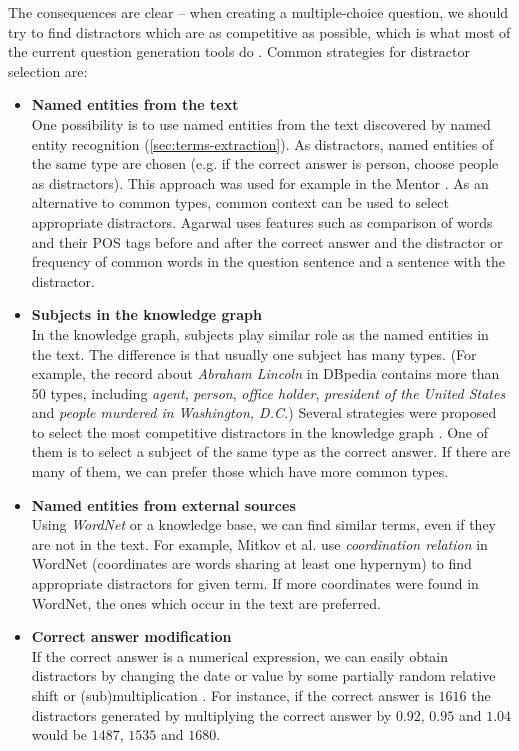 \documentclass[12pt, twoside]{fithesis2}
\renewcommand{\_}{\leavevmode \kern0.07em\vbox{\hrule width0.4em}}
\newcommand{\squarebullet}{\textcolor{black}{\raisebox{0.15em}{\rule{4pt}{4pt}}}}
\newcommand{\emptysquarebullet}{\textcolor{black}{\raisebox{0.10em}{\tiny$\square$}}}
\newenvironment{myItemize}{
  \begin{itemize}[leftmargin=2em,rightmargin=1em,itemsep=\parskip ,parsep=0em,topsep=0em,partopsep=0em]
  \renewcommand{\labelitemi}{\squarebullet}
  \renewcommand{\labelitemii}{\textbullet}
}{
  \end{itemize}
}
\newcounter{choice}
\begin{document}
The consequences are clear -- when creating a multiple-choice question, we should try to find distractors which are as competitive as possible,
which is what most of the current question generation tools do
\cite{question-gen-mitkov, question-gen-textbooks, mentor}.
Common strategies for distractor selection are:
\begin{myItemize}
\item \textbf{Named entities from the text}\\
  One possibility is to use named entities from the text discovered by named entity recognition (\autoref{sec:terms-extraction}). As distractors, named entities of the same type are chosen (e.g. if the correct answer is person, choose people as distractors). This approach was used for example in the Mentor \cite{mentor}.
As an alternative to common types, common context can be used to select appropriate distractors.
Agarwal \cite{question-gen-textbooks} uses features such as comparison of words and their POS tags before and after the correct answer and the distractor or frequency of common words in the question sentence and a sentence with the distractor.

\item \textbf{Subjects in the knowledge graph}\\
In the knowledge graph, subjects play similar role as the named entities in the text.
The difference is that usually one subject has many types.
(For example, the record about \emph{Abraham Lincoln} in DBpedia contains more than 50 types, including
\emph{agent}, \emph{person}, \emph{office holder}, \emph{president of the United States} and \emph{people murdered in Washington, D.C.})
Several strategies were proposed to select the most competitive distractors in the knowledge graph \cite{ontoque, question-gen-domain-ontologies}. One of them is to select a subject of the same type as the correct answer. If there are many of them, we can prefer those which have more common types.

\item \textbf{Named entities from external sources}\\
  Using \textit{WordNet} \cite{wordnet} or a knowledge base, we can find similar terms, even if they are not in the text. For example, Mitkov et al. \cite{question-gen-mitkov} use \textit{coordination relation} in WordNet (coordinates are words sharing at least one hypernym) to find appropriate distractors for given term. If more coordinates were found in WordNet, the ones which occur in the text are preferred.

\item \textbf{Correct answer modification}\\
  If the correct answer is a numerical expression, we can easily obtain distractors by changing the date or value by some partially random relative shift or (sub)multiplication
\cite{question-gen-domain-ontologies}.
For instance, if the correct answer is $1616$ the distractors generated by multiplying the correct answer by $0.92$, $0.95$ and $1.04$ would be $1487$, $1535$ and $1680$.
\end{myItemize}
\end{document}
